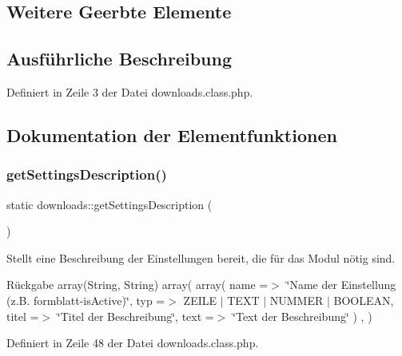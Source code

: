 \subsection*{Weitere Geerbte Elemente}


\subsection{Ausführliche Beschreibung}


Definiert in Zeile 3 der Datei downloads.\+class.\+php.



\subsection{Dokumentation der Elementfunktionen}
\mbox{\label{classdownloads_a109b0a4df8dc75bc95c95a51726db27d}} 
\subsubsection{\texorpdfstring{get\+Settings\+Description()}{getSettingsDescription()}}
{\footnotesize\ttfamily static downloads\+::get\+Settings\+Description (\begin{DoxyParamCaption}{ }\end{DoxyParamCaption})\hspace{0.3cm}{\ttfamily [static]}}

Stellt eine Beschreibung der Einstellungen bereit, die für das Modul nötig sind. \begin{DoxyReturn}{Rückgabe}
array(\+String, String) array( array( \textquotesingle{}name\textquotesingle{} =$>$ \char`\"{}\+Name der Einstellung (z.\+B. formblatt-\/is\+Active)\char`\"{}, \textquotesingle{}typ\textquotesingle{} =$>$ Z\+E\+I\+LE $\vert$ T\+E\+XT $\vert$ N\+U\+M\+M\+ER $\vert$ B\+O\+O\+L\+E\+AN, \textquotesingle{}titel\textquotesingle{} =$>$ \char`\"{}\+Titel der Beschreibung\char`\"{}, \textquotesingle{}text\textquotesingle{} =$>$ \char`\"{}\+Text der Beschreibung\char`\"{} ) , ) 
\end{DoxyReturn}


Definiert in Zeile 48 der Datei downloads.\+class.\+php.

\mbox{\label{classdownloads_af9aa70ddcc1375cff89835c4a5a18198}} 

